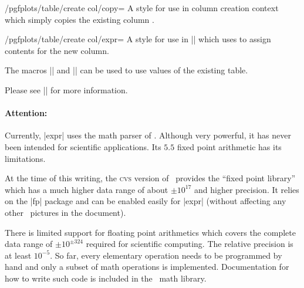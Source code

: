 \begin{stylekey}{/pgfplots/table/create col/copy=}
	A style for use in column creation context which simply copies the existing column .
\begin{codeexample}[]

\end{codeexample}
\end{stylekey}

\begin{stylekey}{/pgfplots/table/create col/expr=}
	A style for use in |\pgfplotstablecreatecol| which uses  to assign contents for the new column.

\begin{codeexample}[]

\end{codeexample}
	The macros |\thisrow| and |\nextrow| can be used to use values of the existing table.

	Please see |\pgfplotstablecreatecol| for more information.

	\paragraph{Attention:} Currently, |expr| uses the math parser of \PGF. Although very powerful, it has never been intended for scientific applications. Its $5.5$ fixed point arithmetic has its limitations.

	At the time of this writing, the \textsc{cvs} version of \PGF\ provides the ``fixed point library'' which has a much higher data range of about $\pm 10^{17}$ and higher precision. It relies on the |fp| package and can be enabled easily for |expr| (without affecting any other \PGF\ pictures in the document).

	There is limited support for floating point arithmetics which covers the complete data range of $\pm 10^{\pm 324}$ required for scientific computing. The relative precision is at least $10^{-5}$. So far, every elementary operation needs to be programmed by hand and only a subset of math operations is implemented. Documentation for how to write such code is included in the \PGF\ math library.
\end{stylekey}

